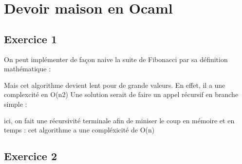 \hypertarget{devoir-maison-en-ocaml}{%
\section{Devoir maison en Ocaml}\label{devoir-maison-en-ocaml}}

\hypertarget{exercice-1}{%
\subsection{Exercice 1}\label{exercice-1}}

On peut implémenter de façon naive la suite de Fibonacci par sa
définition mathématique :

\begin{Shaded}
\begin{Highlighting}[]
 
  \NormalTok{ | }
\NormalTok{)}
\end{Highlighting}
\end{Shaded}

Mais cet algorithme devient lent pour de grande valeurs. En effet, il a
une complexcité en O(n2) Une solution serait de faire un appel récursif
en branche simple :

\begin{Shaded}
\begin{Highlighting}[]
   
\NormalTok{    | }\NormalTok{ {-}\textgreater{} (}\NormalTok{,}\NormalTok{)}
\NormalTok{    | }\NormalTok{ {-}\textgreater{} (}\NormalTok{,}\NormalTok{)}
\NormalTok{) }
\end{Highlighting}
\end{Shaded}

ici, on fait une récursivité terminale afin de miniser le coup en
mémoire et en temps : cet algorithme a une compléxicité de O(n)

\hypertarget{exercice-2}{%
\subsection{Exercice 2}\label{exercice-2}}

